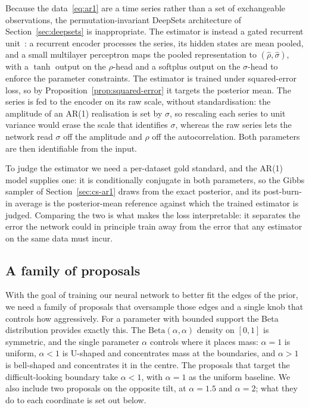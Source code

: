 Because the data~\eqref{eq:ar1} are a time series rather than a set of
exchangeable observations, the permutation-invariant DeepSets
architecture of Section~\ref{sec:deepsets} is inappropriate. The
estimator is instead a gated recurrent unit~\citep{cho2014gru}: a
recurrent encoder processes the series, its hidden states are mean
pooled, and a small multilayer perceptron maps the pooled
representation to $(\hat{\rho}, \hat{\sigma})$, with a $\tanh$ output on
the $\rho$-head and a softplus output on the $\sigma$-head to enforce
the parameter constraints. The estimator is trained under squared-error
loss, so by Proposition~\ref{prop:squared-error} it targets the
posterior mean. The series is fed to the encoder on its raw scale,
without standardisation: the amplitude of an AR(1) realisation is set by
$\sigma$, so rescaling each series to unit variance would erase the
scale that identifies $\sigma$, whereas the raw series lets
the network read $\sigma$ off the amplitude and $\rho$ off the
autocorrelation. Both parameters are then identifiable from the input.

To judge the estimator we need a per-dataset gold standard, and the
AR(1) model supplies one: it is conditionally conjugate in both
parameters, so the Gibbs sampler of Section~\ref{sec:cs-ar1} draws from
the exact posterior, and its post-burn-in average is the posterior-mean
reference against which the trained estimator is judged. Comparing the
two is what makes the loss interpretable: it
separates the error the network could in principle train away from the
error that any estimator on the same data must incur.


\subsection{A family of proposals}
\label{sec:is-proposals}

With the goal of training our neural network to better fit the edges of the prior, we need a family of proposals that oversample those edges and a single knob that controls how aggressively. For a parameter with bounded support the Beta
distribution provides exactly this. The $\mathrm{Beta}(\alpha, \alpha)$
density on $[0,1]$ is symmetric, and the single parameter $\alpha$
controls where it places mass: $\alpha = 1$ is uniform, $\alpha < 1$ is
U-shaped and concentrates mass at the boundaries, and $\alpha > 1$ is
bell-shaped and concentrates it in the centre. The proposals that target
the difficult-looking boundary take $\alpha < 1$, with $\alpha = 1$ as
the uniform baseline. We also include two proposals on the opposite tilt,
at $\alpha = 1.5$ and $\alpha = 2$; what they do to each coordinate is set
out below.

